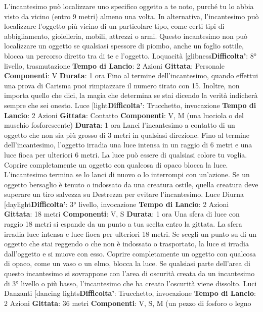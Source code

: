 \begin{multicols}{2}
L’incantesimo può localizzare uno specifico oggetto a te
noto, purché tu lo abbia visto da vicino (entro 9 metri)
almeno una volta. In alternativa, l’incantesimo può
localizzare l’oggetto più vicino di un particolare tipo,
come certi tipi di abbigliamento, gioielleria, mobili,
attrezzi o armi.
Questo incantesimo non può localizzare un oggetto se
qualsiasi spessore di piombo, anche un foglio sottile,
blocca un percorso diretto tra di te e l’oggetto.
Loquacità
[glibness\textbf{Difficolta'}:
8° livello, trasmutazione
\textbf{Tempo di Lancio}: 2 Azioni
\textbf{Gittata}: Personale
\textbf{Componenti}: V
\textbf{Durata}: 1 ora
Fino al termine dell’incantesimo, quando effettui una
prova di Carisma puoi rimpiazzare il numero tirato con
15. Inoltre, non importa quello che dici, la magia che
determina se stai dicendo la verità indicherà sempre
che sei onesto.
Luce
[light\textbf{Difficolta'}:
Trucchetto, invocazione
\textbf{Tempo di Lancio}: 2 Azioni
\textbf{Gittata}: Contatto
\textbf{Componenti}: V, M (una lucciola o del muschio
fosforescente)
\textbf{Durata}: 1 ora
Lanci l’incantesimo a contatto di un oggetto che non sia
più grosso di 3 metri in qualsiasi direzione. Fino al
termine dell’incantesimo, l’oggetto irradia una luce
intensa in un raggio di 6 metri e una luce fioca per
ulteriori 6 metri. La luce può essere di qualsiasi colore
tu voglia. Coprire completamente un oggetto con
qualcosa di opaco blocca la luce. L’incantesimo termina
se lo lanci di nuovo o lo interrompi con un’azione.
Se un oggetto bersaglio è tenuto o indossato da una
creatura ostile, quella creatura deve superare un tiro
salvezza su Destrezza per evitare l’incantesimo.
Luce Diurna
[daylight\textbf{Difficolta'}:
3° livello, invocazione
\textbf{Tempo di Lancio}: 2 Azioni
\textbf{Gittata}: 18 metri
\textbf{Componenti}: V, S
\textbf{Durata}: 1 ora
Una sfera di luce con raggio 18 metri si espande da un
punto a tua scelta entro la gittata. La sfera irradia luce
intensa e luce fioca per ulteriori 18 metri.
Se scegli un punto su di un oggetto che stai reggendo o
che non è indossato o trasportato, la luce si irradia
dall’oggetto e si muove con esso. Coprire
completamente un oggetto con qualcosa di opaco,
come un vaso o un elmo, blocca la luce.
Se qualsiasi parte dell’area di questo incantesimo si
sovrappone con l’area di oscurità creata da un
incantesimo di 3° livello o più basso, l’incantesimo che
ha creato l’oscurità viene dissolto.
Luci Danzanti
[dancing lights\textbf{Difficolta'}:
Trucchetto, invocazione
\textbf{Tempo di Lancio}: 2 Azioni
\textbf{Gittata}: 36 metri
\textbf{Componenti}: V, S, M (un pezzo di fosforo o legno

\end{multicols}
